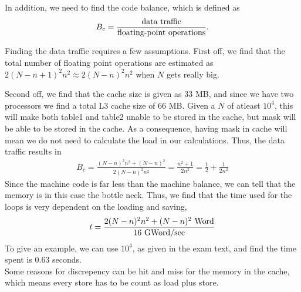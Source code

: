 \documentclass{article}
\begin{document}
\begin{enumerate}[label=(\alph*)]
In addition, we need to find the code balance, which is defined as
\begin{align*}
  B_c = \frac{\textnormal{data traffic}}{\textnormal{floating-point operations}}.
\end{align*}

Finding the data traffic requires a few assumptions. First off, we find that the total number of floating point operations are estimated as $2(N-n+1)^2 n^2 \approx 2(N-n)^2 n^2$ when $N$ gets really big.

Second off, we find that the cache size is given as $33$ MB, and since we have two processors we find a total L3 cache size of $66$ MB. Given a $N$ of atleast $10^4$, this will make both table1 and table2 unable to be stored in the cache, but mask will be able to be stored in the cache. As a consequence, having mask in cache will mean we do not need to calculate the load in our calculations. Thus, the data traffic results in
\begin{align*}
  B_c = \frac{(N-n)^2n^2 + (N-n)^2 }{2(N-n)^2n^2} = \frac{n^2 + 1}{2n^2} = \frac{1}{2} + \frac{1}{2n^2}
\end{align*}
Since the machine code is far less than the machine balance, we can tell that the memory is in this case the bottle neck. Thus, we find that the time used for the loops is very dependent on the loading and saving,
\begin{align*}
  t = \frac{2(N-n)^2n^2 + (N-n)^2 \textnormal{ Word}}{16\textnormal{ GWord/sec}}
\end{align*}
To give an example, we can use $10^4$, as given in the exam text, and find the time spent is $0.63$ seconds.\\

Some reasons for discrepency can be hit and miss for the memory in the cache, which means every store has to be count as load plus store.

\end{enumerate}
\end{document}
